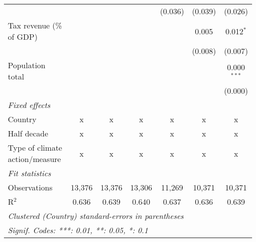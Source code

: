 \begin{tabular}{lcccccc}
                                                             &         &              &               & (0.036)      & (0.039)      & (0.026)\\   
   Tax revenue (\% of GDP)                                   &         &              &               &              & 0.005        & 0.012$^{*}$\\   
                                                             &         &              &               &              & (0.008)      & (0.007)\\   
   Population total                                          &         &              &               &              &              & 0.000$^{***}$\\   
                                                             &         &              &               &              &              & (0.000)\\   
   \emph{Fixed effects}\\
   Country                                                   & x       & x            & x             & x            & x            & x\\  
   Half decade                                               & x       & x            & x             & x            & x            & x\\  
   Type of climate action/measure                            & x       & x            & x             & x            & x            & x\\  
   \midrule \emph{Fit statistics}\\
   Observations                                              & 13,376  & 13,376       & 13,306        & 11,269       & 10,371       & 10,371\\  
   R$^2$                                                     & 0.636   & 0.639        & 0.640         & 0.637        & 0.636        & 0.639\\  
   \midrule
   \multicolumn{7}{l}{\emph{Clustered (Country) standard-errors in parentheses}}\\
   \multicolumn{7}{l}{\emph{Signif. Codes: ***: 0.01, **: 0.05, *: 0.1}}\\
\end{tabular}
\par\endgroup


